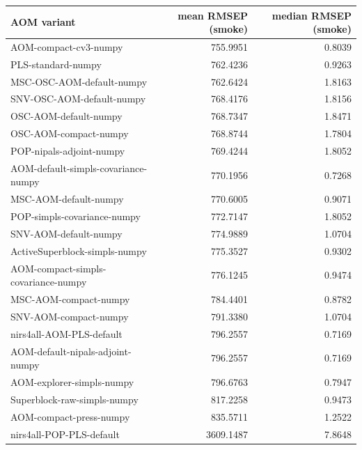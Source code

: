 \begin{tabular}{lrr}
\toprule
AOM variant & mean RMSEP (smoke) & median RMSEP (smoke) \\
\midrule
AOM-compact-cv3-numpy & 755.9951 & 0.8039 \\
PLS-standard-numpy & 762.4236 & 0.9263 \\
MSC-OSC-AOM-default-numpy & 762.6424 & 1.8163 \\
SNV-OSC-AOM-default-numpy & 768.4176 & 1.8156 \\
OSC-AOM-default-numpy & 768.7347 & 1.8471 \\
OSC-AOM-compact-numpy & 768.8744 & 1.7804 \\
POP-nipals-adjoint-numpy & 769.4244 & 1.8052 \\
AOM-default-simpls-covariance-numpy & 770.1956 & 0.7268 \\
MSC-AOM-default-numpy & 770.6005 & 0.9071 \\
POP-simpls-covariance-numpy & 772.7147 & 1.8052 \\
SNV-AOM-default-numpy & 774.9889 & 1.0704 \\
ActiveSuperblock-simpls-numpy & 775.3527 & 0.9302 \\
AOM-compact-simpls-covariance-numpy & 776.1245 & 0.9474 \\
MSC-AOM-compact-numpy & 784.4401 & 0.8782 \\
SNV-AOM-compact-numpy & 791.3380 & 1.0704 \\
nirs4all-AOM-PLS-default & 796.2557 & 0.7169 \\
AOM-default-nipals-adjoint-numpy & 796.2557 & 0.7169 \\
AOM-explorer-simpls-numpy & 796.6763 & 0.7947 \\
Superblock-raw-simpls-numpy & 817.2258 & 0.9473 \\
AOM-compact-press-numpy & 835.5711 & 1.2522 \\
nirs4all-POP-PLS-default & 3609.1487 & 7.8648 \\
\bottomrule
\end{tabular}
